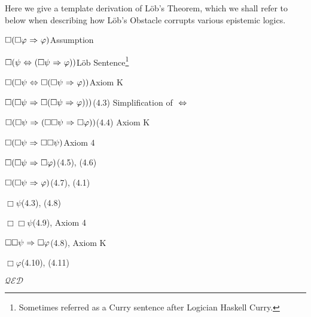 %

Here we give a template derivation of L\"ob's Theorem, which we shall refer to below when describing how L\"ob's Obstacle corrupts various epistemic logics.

\begin{proofenum}
	\item $\Box(\Box\varphi {\ \Rightarrow \ } \varphi)$\mbox{}\dotfill Assumption
	\item $\Box(\psi {\ \Leftrightarrow \ } (\Box\psi{\ \Rightarrow \ } \varphi))$\mbox{}\dotfill L\"ob Sentence\footnote{Sometimes referred as a Curry sentence after Logician Haskell Curry.}
	\item $\Box(\Box\psi {\ \Leftrightarrow \ } \Box(\Box\psi {\ \Rightarrow \ } \varphi))$\mbox{}\dotfill Axiom K
	\item $\Box(\Box\psi {\ \Rightarrow \ } \Box(\Box\psi {\ \Rightarrow \ } \varphi)))$\mbox{}\dotfill (4.3) Simplification of ${\ \Leftrightarrow \ }$
	\item $\Box(\Box\psi {\ \Rightarrow \ } (\Box\Box\psi {\ \Rightarrow \ } \Box\varphi))$\mbox{}\dotfill (4.4) Axiom K
	\item $\Box(\Box\psi {\ \Rightarrow \ } \Box\Box\psi)$\mbox{}\dotfill Axiom 4
	\item $\Box(\Box\psi {\ \Rightarrow \ } \Box\varphi)$\mbox{}\dotfill (4.5), (4.6)
	\item $\Box(\Box\psi {\ \Rightarrow \ } \varphi)$\mbox{}\dotfill (4.7), (4.1)
	\item $\Box\psi$\mbox{}\dotfill (4.3), (4.8)
	\item $\Box\Box\psi$\mbox{}\dotfill (4.9), Axiom 4
	\item $\Box\Box\psi {\ \Rightarrow \ } \Box\varphi$\mbox{}\dotfill (4.8), Axiom K
	\item $\Box\varphi$\mbox{}\dotfill (4.10), (4.11)
\end{proofenum}\mbox{}\hfill $\mathcal{QED}$

